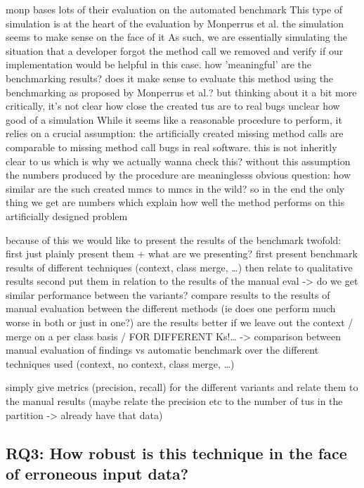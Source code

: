 monp bases lots of their evaluation on the automated benchmark
    This type of simulation is at the heart of the evaluation by Monperrus et al.
the simulation seems to make sense on the face of it
As such, we are essentially simulating the situation that a developer forgot the method call we removed and verify if our implementation would be helpful in this case.
    how 'meaningful' are the benchmarking results?
    does it make sense to evaluate this method using the benchmarking as proposed by Monperrus et al.?
but thinking about it a bit more critically, it's not clear how close the created tus are to real bugs
    unclear how good of a simulation
    While it seems like a reasonable procedure to perform, it relies on a crucial assumption: the artificially created missing method calls are comparable to missing method call bugs in real software.
    this is not inheritly clear to us which is why we actually wanna check this?
    without this assumption the numbers produced by the procedure are meaninglesss
    obvious question: how similar are the such created mmcs to mmcs in the wild?
so in the end the only thing we get are numbers which explain how well the method performs on this artificially designed problem

because of this we would like to present the results of the benchmark twofold:
first just plainly present them + what are we presenting?
    first present benchmark results of different techniques (context, class merge, \ldots) then relate to qualitative results
second put them in relation to the results of the manual eval -> do we get similar performance between the variants?
    compare results to the results of manual evaluation between the different methods (ie does one perform much worse in both or just in one?)
    are the results better if we leave out the context / merge on a per class basis / FOR DIFFERENT Ks!\ldots
    -> comparison between manual evaluation of findings vs automatic benchmark over the different techniques used (context, no context, class merge, \ldots)

simply give metrics (precision, recall) for the different variants and relate them to the manual results
(maybe relate the precision etc to the number of tus in the partition -> already have that data)

\subsection{RQ3: How robust is this technique in the face of erroneous input data?}

